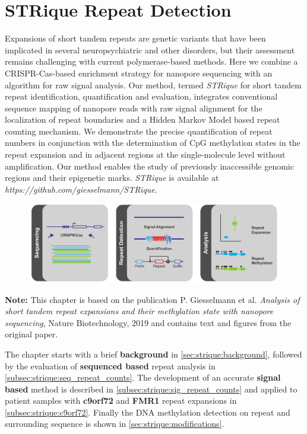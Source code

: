 \chapter{STRique Repeat Detection}
\label{cha:strique}

Expansions of short tandem repeats are genetic variants that have been implicated in several neuropsychiatric and other disorders, but their assessment remains challenging with current polymerase-based methods. Here we combine a CRISPR-Cas-based enrichment strategy for nanopore sequencing with an algorithm for raw signal analysis. Our method, termed \textit{STRique} for short tandem repeat identification, quantification and evaluation, integrates conventional sequence mapping of nanopore reads with raw signal alignment for the localization of repeat boundaries and a Hidden Markov Model based repeat counting mechanism. We demonstrate the precise quantification of repeat numbers in conjunction with the determination of CpG methylation states in the repeat expansion and in adjacent regions at the single-molecule level without amplification. Our method enables the study of previously inaccessible genomic regions and their epigenetic marks. \textit{STRique} is available at \textit{https://github.com/giesselmann/STRique}.

\begin{figure}[h]
    \centering
    \includegraphics[width=1.0\textwidth]{figures/strique/GA.pdf}
    \label{fig:strique:ga}
\end{figure}

\textbf{Note:} This chapter is based on the publication P. Giesselmann et al. \textit{Analysis of short tandem repeat expansions and their methylation state with nanopore sequencing}, Nature Biotechnology, 2019 and contains text and figures from the original paper.

The chapter starts with a brief \textbf{background} in \ref{sec:strique:background}, followed by the evaluation of \textbf{sequenced based} repeat analysis in \ref{subsec:strique:seq_repeat_counts}. The development of an accurate \textbf{signal based} method is described in \ref{subsec:strique:sig_repeat_counts} and applied to patient samples with \textbf{c9orf72} and \textbf{FMR1} repeat expansions in \ref{subsec:strique:c9orf72}. Finally the DNA methylation detection on repeat and surrounding sequence is shown in \ref{sec:strique:modifications}.




